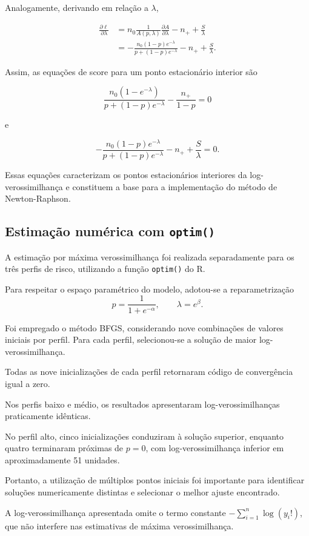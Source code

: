 Analogamente, derivando em relação a $\lambda$,

\begin{align}
\frac{\partial\ell}{\partial\lambda}
&=
n_0\frac{1}{A(p,\lambda)}
\frac{\partial A}{\partial\lambda}
-n_++\frac{S}{\lambda}\\
&=
-\frac{n_0(1-p)e^{-\lambda}}
{p+(1-p)e^{-\lambda}}
-n_++\frac{S}{\lambda}.
\end{align}

Assim, as equações de score para um ponto
estacionário interior são

\begin{equation}
\boxed{
\frac{n_0(1-e^{-\lambda})}
{p+(1-p)e^{-\lambda}}
-\frac{n_+}{1-p}=0
}
\end{equation}

e

\begin{equation}
\boxed{
-\frac{n_0(1-p)e^{-\lambda}}
{p+(1-p)e^{-\lambda}}
-n_++\frac{S}{\lambda}=0.
}
\end{equation}

Essas equações caracterizam os pontos estacionários
interiores da log-verossimilhança e constituem a
base para a implementação do método de Newton-Raphson.


\subsection{Estimação numérica com \texttt{optim()}}

A estimação por máxima verossimilhança foi realizada
separadamente para os três perfis de risco,
utilizando a função \texttt{optim()} do R.

Para respeitar o espaço paramétrico do modelo,
adotou-se a reparametrização
\[
p=\frac{1}{1+e^{-\alpha}},
\qquad
\lambda=e^\beta.
\]

Foi empregado o método BFGS, considerando nove
combinações de valores iniciais por perfil.
Para cada perfil, selecionou-se a solução de
maior log-verossimilhança.

\begin{table}[htbp]
\centering
\caption{Estimativas de máxima verossimilhança
do modelo ZIP por perfil de risco.}

\end{table}

Todas as nove inicializações de cada perfil
retornaram código de convergência igual a zero.

Nos perfis baixo e médio, os resultados apresentaram
log-verossimilhanças praticamente idênticas.

No perfil alto, cinco inicializações conduziram
à solução superior, enquanto quatro terminaram
próximas de $p=0$, com log-verossimilhança inferior
em aproximadamente 51 unidades.

Portanto, a utilização de múltiplos pontos
iniciais foi importante para identificar
soluções numericamente distintas e selecionar
o melhor ajuste encontrado.

A log-verossimilhança apresentada omite
o termo constante
$-\sum_{i=1}^{n}\log(y_i!)$,
que não interfere nas estimativas de
máxima verossimilhança.
